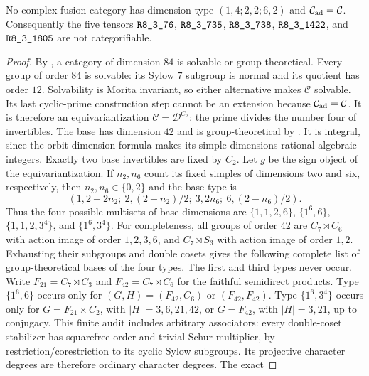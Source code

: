 \begin{theorem}\label{thm:m3-dimension84}
No complex fusion category has dimension type $(1,4;2,2;6,2)$ and
$\mathcal C_{\rm ad}=\mathcal C$. Consequently the five tensors
$\sha{R8_3_76}$, $\sha{R8_3_735}$, $\sha{R8_3_738}$, $\sha{R8_3_1422}$, and
$\sha{R8_3_1805}$ are not categorifiable.
\end{theorem}
\begin{proof}
By \cite[Theorem~1.2]{DongWeak}, a category of dimension $84$ is
solvable or group-theoretical. Every group of order $84$ is solvable:
its Sylow $7$ subgroup is normal and its quotient has order $12$.
Solvability is Morita invariant, so either alternative makes
$\mathcal C$ solvable. Its last cyclic-prime construction step
\cite[Definition~1.2, Proposition~4.4]{ENOSolvable} cannot be an
extension because $\mathcal C_{\rm ad}=\mathcal C$. It is therefore
an equivariantization $\mathcal C=\mathcal D^{C_2}$: the prime divides
the number four of invertibles. The base has dimension $42$ and is
group-theoretical by \cite[Theorem~9.2]{ENOSolvable}. It is integral,
since the orbit dimension formula makes its simple dimensions rational
algebraic integers. Exactly two base invertibles are fixed by $C_2$.
Let $g$ be the sign object of the equivariantization. If $n_2,n_6$
count its fixed simples of dimensions two and six, respectively, then
$n_2,n_6\in\{0,2\}$ and the base type is
\[
 (1,2+2n_2;\ 2,(2-n_2)/2;\ 3,2n_6;\ 6,(2-n_6)/2).
\]
Thus the four possible multisets of base dimensions are
$\{1,1,2,6\}$, $\{1^6,6\}$, $\{1,1,2,3^4\}$, and $\{1^6,3^4\}$.
For completeness, all groups of order $42$ are $C_7\rtimes C_6$
with action image of order $1,2,3,6$, and $C_7\rtimes S_3$ with
action image of order $1,2$. Exhausting their subgroups and double
cosets gives the following complete list of group-theoretical bases
of the four types. The first and third types never occur. Write
$F_{21}=C_7\rtimes C_3$ and $F_{42}=C_7\rtimes C_6$ for the
faithful semidirect products. Type $\{1^6,6\}$ occurs only for
$(G,H)=(F_{42},C_6)$ or $(F_{42},F_{42})$. Type $\{1^6,3^4\}$
occurs only for $G=F_{21}\times C_2$, with $|H|=3,6,21,42$,
or $G=F_{42}$, with $|H|=3,21$, up to conjugacy.
This finite audit includes arbitrary associators: every double-coset
stabilizer has squarefree order and trivial Schur multiplier, by
restriction/corestriction to its cyclic Sylow subgroups. Its projective
character degrees are therefore ordinary character degrees. The exact

\end{proof}
